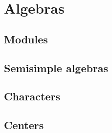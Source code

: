 \documentclass{article}
\begin{document}
\section{Algebras}

\subsection{Modules}

\subsection{Semisimple algebras}

\subsection{Characters}

\subsection{Centers}
\end{document}
